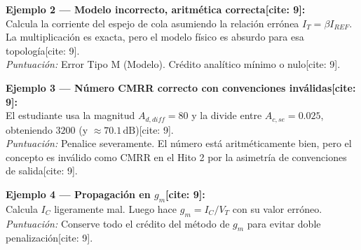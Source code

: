\documentclass[11pt, a4paper]{article}
\begin{document}
\vspace{0.2cm}
\textbf{Ejemplo 2 — Modelo incorrecto, aritmética correcta[cite: 9]:} \\
Calcula la corriente del espejo de cola asumiendo la relación errónea $I_T = \beta I_{REF}$. La multiplicación es exacta, pero el modelo físico es absurdo para esa topología[cite: 9]. \\
\textit{Puntuación:} Error Tipo M (Modelo). Crédito analítico mínimo o nulo[cite: 9].

\vspace{0.2cm}
\textbf{Ejemplo 3 — Número CMRR correcto con convenciones inválidas[cite: 9]:} \\
El estudiante usa la magnitud $A_{d,diff} = 80$ y la divide entre $A_{c,se} = 0.025$, obteniendo $3200$ (y $\approx 70.1\,\text{dB}$)[cite: 9]. \\
\textit{Puntuación:} Penalice severamente. El número está aritméticamente bien, pero el concepto es inválido como CMRR en el Hito 2 por la asimetría de convenciones de salida[cite: 9].

\vspace{0.2cm}
\textbf{Ejemplo 4 — Propagación en $g_m$[cite: 9]:} \\
Calcula $I_C$ ligeramente mal. Luego hace $g_m = I_C/V_T$ con su valor erróneo. \\
\textit{Puntuación:} Conserve todo el crédito del método de $g_m$ para evitar doble penalización[cite: 9].
\end{document}

